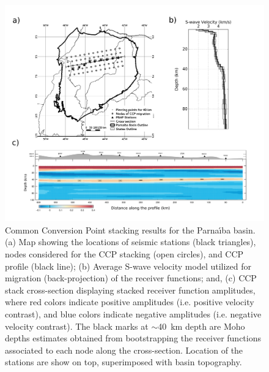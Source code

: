 \documentclass[manuscript,11pt]{geophysics}
\begin{document}
\begin{figure}[!ht]
\begin{center}
\includegraphics[width=\textwidth]{Fig/section_migration.png}
\caption{Common Conversion Point stacking results for the Parna\'{\i}ba basin. (a) Map showing the locations of seismic stations (black triangles), nodes considered for the CCP stacking (open circles), and CCP profile (black line); (b) Average S-wave velocity model utilized for migration (back-projection) of the receiver functions; and, (c) CCP stack cross-section displaying stacked receiver function amplitudes, where red colors indicate positive amplitudes (i.e. positive velocity contrast), and blue colors indicate negative amplitudes (i.e. negative velocity contrast). The black marks at $\sim$40~km depth are Moho depths estimates obtained from bootstrapping the receiver functions associated to each node along the cross-section. Location of the stations are show on top, superimposed with basin topography.}
\label{moisaic_migration}
\end{center}
\end{figure}
\end{document}

